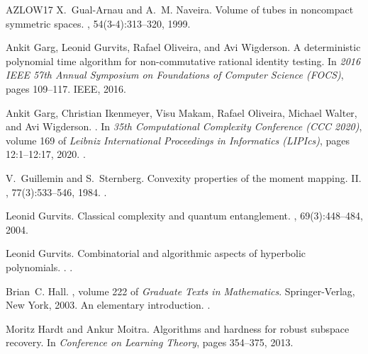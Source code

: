 \documentclass[10pt,a4paper]{article}
\numberwithin{equation}{section}
\begin{document}
\begin{thebibliography}{AZLOW17}
X.~Gual-Arnau and A.~M. Naveira.
\newblock Volume of tubes in noncompact symmetric spaces.
, 54(3-4):313--320, 1999.

Ankit Garg, Leonid Gurvits, Rafael Oliveira, and Avi Wigderson.
\newblock A deterministic polynomial time algorithm for non-commutative
  rational identity testing.
\newblock In {\em 2016 IEEE 57th Annual Symposium on Foundations of Computer
  Science (FOCS)}, pages 109--117. IEEE, 2016.

Ankit Garg, Christian Ikenmeyer, Visu Makam, Rafael Oliveira, Michael Walter,
  and Avi Wigderson.
.
\newblock In {\em 35th Computational Complexity Conference (CCC 2020)}, volume
  169 of {\em Leibniz International Proceedings in Informatics (LIPIcs)}, pages
  12:1--12:17, 2020.
\newblock \href {https://doi.org/10.4230/LIPIcs.CCC.2020.12}
  {}.

V.~Guillemin and S.~Sternberg.
\newblock Convexity properties of the moment mapping. {II}.
, 77(3):533--546, 1984.
\newblock \href {https://doi.org/10.1007/BF01388837}
  {}.

Leonid Gurvits.
\newblock Classical complexity and quantum entanglement.
, 69(3):448--484, 2004.

Leonid Gurvits.
\newblock Combinatorial and algorithmic aspects of hyperbolic polynomials.
.
\newblock \href {http://arxiv.org/abs/math/0404474}
  {}.

Brian~C. Hall.
, volume 222 of
  {\em Graduate Texts in Mathematics}.
\newblock Springer-Verlag, New York, 2003.
\newblock An elementary introduction.
\newblock \href {https://doi.org/10.1007/978-0-387-21554-9}
  {}.

Moritz Hardt and Ankur Moitra.
\newblock Algorithms and hardness for robust subspace recovery.
\newblock In {\em Conference on Learning Theory}, pages 354--375, 2013.


\end{thebibliography}
\end{document}
